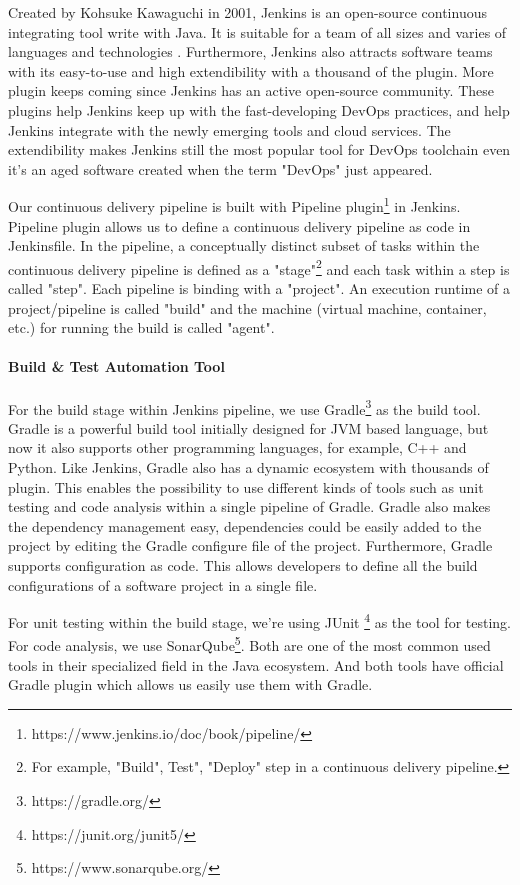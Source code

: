 \par
Created by Kohsuke Kawaguchi in 2001, Jenkins is an open-source continuous integrating tool write with Java. It is suitable for a team of all sizes and varies of languages and technologies \cite{smart2011jenkins}. Furthermore, Jenkins also attracts software teams with its easy-to-use and high extendibility \cite{smart2011jenkins} with a thousand of the plugin. More plugin keeps coming since Jenkins has an active open-source community. These plugins help Jenkins keep up with the fast-developing DevOps practices, and help Jenkins integrate with the newly emerging tools and cloud services. The extendibility makes Jenkins still the most popular tool for DevOps toolchain even it's an aged software created when the term "DevOps" just appeared.
\par
Our continuous delivery pipeline is built with Pipeline plugin\footnote{https://www.jenkins.io/doc/book/pipeline/} in Jenkins.
Pipeline plugin allows us to define a continuous delivery pipeline as code in Jenkinsfile.
In the pipeline, a conceptually distinct subset of tasks within the continuous delivery pipeline \cite{Pipeline85:online} is defined as a "stage"\footnote{For example, "Build", Test", "Deploy" step in a continuous delivery pipeline.} and each task within a step is called "step". Each pipeline is binding with a "project". An execution runtime of a project/pipeline is called "build" and the machine (virtual machine, container, etc.) for running the build is called "agent".
\paragraph[]{Build \& Test Automation Tool}
For the build stage within Jenkins pipeline, we use Gradle\footnote{https://gradle.org/} as the build tool.
Gradle is a powerful build tool initially designed for JVM based language, but now it also supports other programming languages, for example, C++ and Python. Like Jenkins, Gradle also has a dynamic ecosystem with thousands of plugin. This enables the possibility to use different kinds of tools such as unit testing and code analysis within a single pipeline of Gradle. Gradle also makes the dependency management easy, dependencies could be easily added to the project by editing the Gradle configure file of the project. Furthermore, Gradle supports configuration as code. This allows developers to define all the build configurations of a software project in a single file.
\par
For unit testing within the build stage, we're using JUnit \footnote{https://junit.org/junit5/} as the tool for testing. For code analysis, we use SonarQube\footnote{https://www.sonarqube.org/}. Both are one of the most common used tools in their specialized field in the Java ecosystem. And both tools have official Gradle plugin which allows us easily use them with Gradle.
